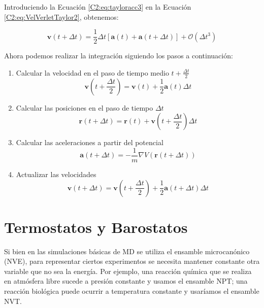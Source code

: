 Introduciendo la Ecuación \ref{C2:eq:tayloracc3} en la Ecuación \ref{C2:eq:VelVerletTaylor2}, obtenemos:

\begin{equation}
\mathbf{v}(t+\Delta{}t) = \frac{1}{2}\Delta{}t\left[\mathbf{a}(t)+\mathbf{a}(t+\Delta{}t)\right] + \mathcal{O}(\Delta{}t^{3})
\label{C2:eq:VelVerletTaylor3}
\end{equation}

Ahora podemos realizar la integración siguiendo los pasos a continuación:

\begin{enumerate}
	\item Calcular la velocidad en el paso de tiempo medio $t+\frac{\Delta{}t}{2}$
	\begin{equation}
	\mathbf{v}\left(t+\frac{\Delta{}t}{2}\right) = \mathbf{v}(t) + \frac{1}{2}\mathbf{a}(t)\Delta{}t
	\end{equation}
	\item Calcular las posiciones en el paso de tiempo $\Delta{}t$
	\begin{equation}
	\mathbf{r}(t+\Delta{}t) = \mathbf{r}(t) + \mathbf{v}\left(t+\frac{\Delta{}t}{2}\right)\Delta{}t
	\end{equation}
	\item Calcular las aceleraciones a partir del potencial
	\begin{equation}
	\mathbf{a}(t+\Delta{}t) = -\frac{1}{m}\nabla{}V\left(\mathbf{r}(t+\Delta{}t)\right)
	\end{equation}
	\item Actualizar las velocidades
	\begin{equation}
	\mathbf{v}(t+\Delta{}t) = \mathbf{v}\left(t+\frac{\Delta{}t}{2}\right) + \frac{1}{2}\mathbf{a}\left(t + \Delta{}t\right)\Delta{}t
	\end{equation}
\end{enumerate}

\section{Termostatos y Barostatos}
\label{S2_5}

Si bien en las simulaciones básicas de MD se utiliza el ensamble microcanónico (NVE), para representar ciertos experimentos se necesita mantener constante otra variable que no sea la energía. Por ejemplo, una reacción química que se realiza en atmósfera libre sucede a presión constante y usamos el ensamble NPT; una reacción biológica puede ocurrir a temperatura constante y usaríamos el ensamble NVT.

